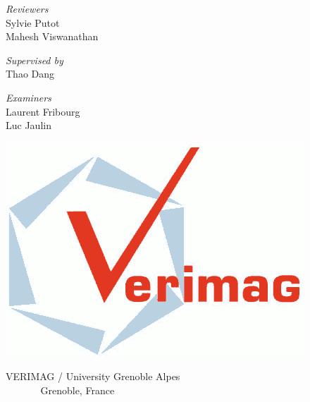 \begin{frame}[plain]
\maketitle
%
%
\begin{minipage}{1\textwidth}
\vspace{-4em}
\begin{minipage}{0.3\textwidth}
{\footnotesize {\it Reviewers}}\\
{\small Sylvie Putot\\
Mahesh Viswanathan}
\end{minipage}
%
\hspace{2em}
\begin{minipage}{0.3\textwidth}
{\footnotesize {\it Supervised by}}\\
{\small Thao Dang}
\end{minipage}
%
\begin{minipage}{0.25\textwidth}
{\footnotesize {\it Examiners}}\\
{\small Laurent Fribourg\\
Luc Jaulin}
\end{minipage}
%
\end{minipage}
%
\begin{minipage}{1\textwidth}
\vspace{0.5em}
\center
%
\begin{minipage}{0.2\textwidth}
\includegraphics[scale=0.15]{figures/LogoVERIMAG.png}
\end{minipage}
%
\begin{minipage}{0.5\textwidth}
{\footnotesize \hspace{0em}VERIMAG / University Grenoble Alpes\\
$~~~~~~~~~~~~~~~~$Grenoble, France}

\end{minipage}
\end{minipage}
\end{frame}
